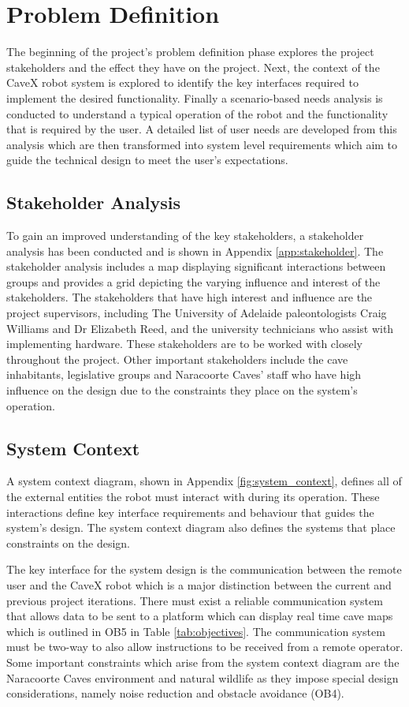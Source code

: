 \section{Problem Definition}
\label{sec:problem-definition}
The beginning of the project's problem definition phase explores the project stakeholders and the effect they have on the project. Next, the context of the CaveX robot system is explored to identify the key interfaces required to implement the desired functionality. Finally a scenario-based needs analysis is conducted to understand a typical operation of the robot and the functionality that is required by the user. A detailed list of user needs are developed from this analysis which are then transformed into system level requirements which aim to guide the technical design to meet the user's expectations.

\subsection{Stakeholder Analysis}
To gain an improved understanding of the key stakeholders, a stakeholder analysis has been conducted and is shown in Appendix \ref{app:stakeholder}. The stakeholder analysis includes a map displaying significant interactions between groups and provides a grid depicting the varying influence and interest of the stakeholders. The stakeholders that have high interest and influence are the project supervisors, including The University of Adelaide paleontologists Craig Williams and Dr Elizabeth Reed, and the university technicians who assist with implementing hardware. These stakeholders are to be worked with closely throughout the project. Other important stakeholders include the cave inhabitants, legislative groups and Naracoorte Caves' staff who have high influence on the design due to the constraints they place on the system's operation.

\subsection{System Context}
A system context diagram, shown in Appendix \ref{fig:system_context}, defines all of the external entities the robot must interact with during its operation. These interactions define key interface requirements and behaviour that guides the system's design. The system context diagram also defines the systems that place constraints on the design.

The key interface for the system design is the communication between the remote user and the CaveX robot which is a major distinction between the current and previous project iterations. There must exist a reliable communication system that allows data to be sent to a platform which can display real time cave maps which is outlined in OB5 in Table \ref{tab:objectives}. The communication system must be two-way to also allow instructions to be received from a remote operator. Some important constraints which arise from the system context diagram are the Naracoorte Caves environment and natural wildlife as they impose special design considerations, namely noise reduction and obstacle avoidance (OB4).

